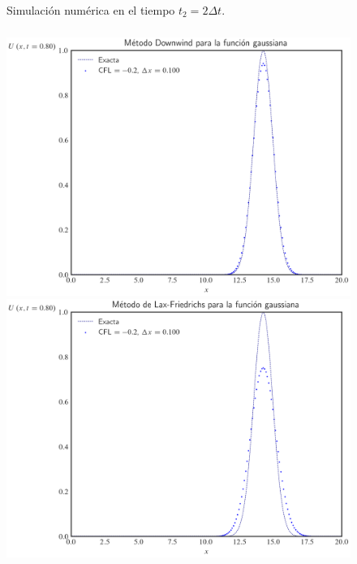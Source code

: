 \begin{frame}
\begin{figure}[ht!]
        \caption{Simulación numérica en el tiempo $t_{2}=2\Delta t$.}
        \label{fig:example1t2}
    \end{figure}
\end{frame}

\begin{frame}
    \frametitle{\secname}

    \begin{figure}[ht!]
        \centering
        \includegraphics[width=.30\paperwidth]{../snapshots/downwindgaussian1d-40.png}
        \includegraphics[width=.30\paperwidth]{../snapshots/lax-friedrichsgaussiana1d-40.png}

\end{figure}
\end{frame}
